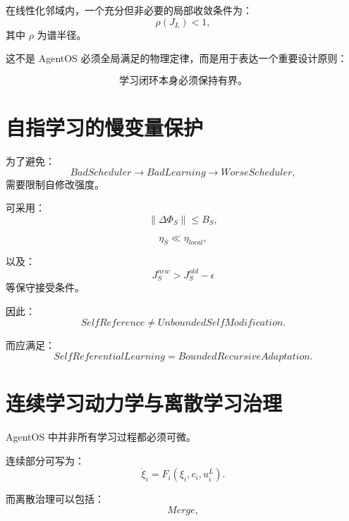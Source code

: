 在线性化邻域内，一个充分但非必要的局部收敛条件为：
\begin{equation}
\boxed{
\rho(J_L)<1,
}
\end{equation}
其中 $\rho$ 为谱半径。

这不是 AgentOS 必须全局满足的物理定律，而是用于表达一个重要设计原则：

\begin{equation}
\boxed{
\text{学习闭环本身必须保持有界。}
}
\end{equation}


\section{自指学习的慢变量保护}

为了避免：
\begin{equation}
BadScheduler
\rightarrow
BadLearning
\rightarrow
WorseScheduler,
\end{equation}
需要限制自修改强度。

可采用：
\begin{equation}
\|\Delta\Phi_S\|
\leq
B_S,
\end{equation}

\begin{equation}
\eta_S
\ll
\eta_{local},
\end{equation}

以及：
\begin{equation}
J_S^{new}
>
J_S^{old}
-
\epsilon
\end{equation}
等保守接受条件。

因此：
\begin{equation}
\boxed{
SelfReference
\neq
UnboundedSelfModification.
}
\end{equation}

而应满足：
\begin{equation}
\boxed{
SelfReferentialLearning
=
BoundedRecursiveAdaptation.
}
\end{equation}


\section{连续学习动力学与离散学习治理}

AgentOS 中并非所有学习过程都必须可微。

连续部分可写为：
\begin{equation}
\dot\xi_i
=
F_i(
\xi_i,c_i,u_i^L
).
\end{equation}

而离散治理可以包括：
\begin{equation}
Merge,
\end{equation}

